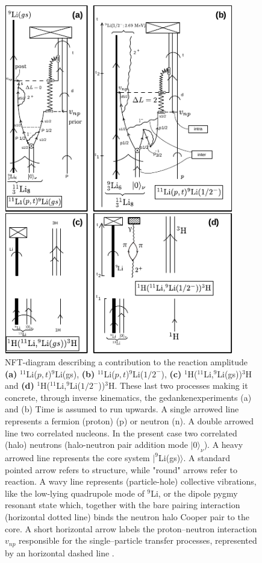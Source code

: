           \begin{figure}
          \centerline {
          \includegraphics*[width=10cm]{introduccion/figs/fig1_9_3xxx}
          }
          \caption{NFT-diagram  describing a contribution to the reaction amplitude \textbf{(a)} $^{11}$Li($p,t$)$^9$Li(gs), \textbf{(b)} $^{11}$Li($p,t$)$^9$Li($1/2^-$), \textbf{(c)}  $^{1}$H($^{11}$Li,$^9$Li(gs))$^3$H and \textbf{(d)} $^{1}$H($^{11}$Li,$^9$Li($1/2^-$))$^3$H. These last two processes making it concrete, through inverse kinematics, the gedankenexperiments (a) and (b) Time is assumed to run upwards.
              	A single arrowed line represents a fermion (proton) (p) or neutron (n). A double arrowed line  two correlated nucleons. In the present case two correlated (halo) neutrons (halo-neutron pair addition mode $|0\rangle_{\nu}$). A heavy arrowed line represents  the core system $|^9$Li(gs)$\rangle$. A standard 
              	pointed arrow refers to structure, while "round" arrows refer to reaction. A wavy line represents (particle-hole) collective vibrations,
              	 like the low-lying quadrupole mode of $^9$Li, or the  dipole pygmy resonant state  which, together  with the bare pairing interaction (horizontal dotted line) binds the neutron  halo Cooper pair to the core.  A short horizontal arrow labels the proton--neutron interaction $v_{np}$ responsible for  the single--particle transfer  processes, represented by an horizontal dashed line .
}
\end{figure}
